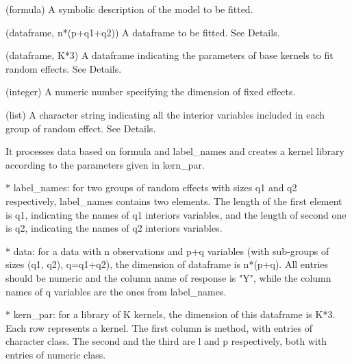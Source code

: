 \documentclass[a4paper]{book}
\begin{document}
\begin{Arguments}
\begin{ldescription}
\item[\code{formula}] (formula) A symbolic description of the model to be fitted.

\item[\code{data}] (dataframe, n*(p+q1+q2)) A dataframe to be fitted. See Details.

\item[\code{kern\_par}] (dataframe, K*3) A dataframe indicating the parameters of
base kernels to fit random effects. See Details.

\item[\code{fixed\_num}] (integer) A numeric number specifying the dimension of
fixed effects.

\item[\code{label\_names}] (list) A character string indicating all the interior
variables included in each group of random effect. See Details.
\end{ldescription}
\end{Arguments}
%
\begin{Details}\relax
It processes data based on formula and label\_names and creates a kernel
library according to the parameters given in kern\_par.

* label\_names: for two groups of random effects with sizes q1 and q2
respectively, label\_names contains two elements. The length of the first
element is q1, indicating the names of q1 interiors variables, and the
length of second one is q2, indicating the names of q2 interiors variables.

* data: for a data with n observations and p+q variables (with sub-groups of
sizes (q1, q2), q=q1+q2), the dimension of dataframe is n*(p+q). All entries
should be numeric and the column name of response is "Y", while the column
names of q variables are the ones from label\_names.

* kern\_par: for a library of K kernels, the dimension of this dataframe is
K*3. Each row represents a kernel. The first column is method, with entries
of character class. The second and the third are l and p respectively, both
with entries of numeric class.
\end{Details}
%
\end{document}
